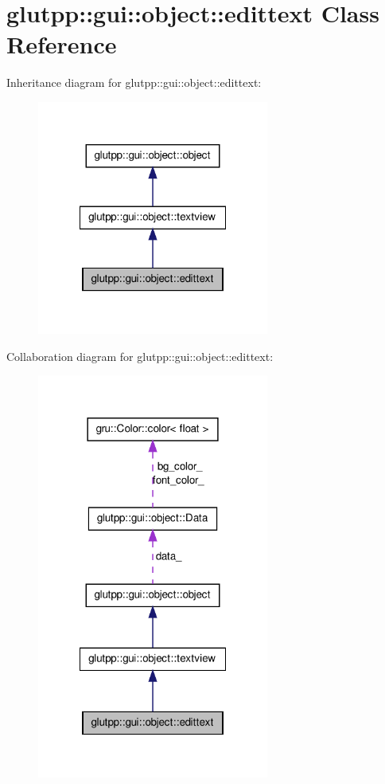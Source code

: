 \hypertarget{classglutpp_1_1gui_1_1object_1_1edittext}{\section{glutpp\-:\-:gui\-:\-:object\-:\-:edittext \-Class \-Reference}
\label{classglutpp_1_1gui_1_1object_1_1edittext}
}


\-Inheritance diagram for glutpp\-:\-:gui\-:\-:object\-:\-:edittext\-:\nopagebreak
\begin{figure}[H]
\begin{center}
\leavevmode
\includegraphics[width=216pt]{classglutpp_1_1gui_1_1object_1_1edittext__inherit__graph}
\end{center}
\end{figure}


\-Collaboration diagram for glutpp\-:\-:gui\-:\-:object\-:\-:edittext\-:
\nopagebreak
\begin{figure}[H]
\begin{center}
\leavevmode
\includegraphics[width=216pt]{classglutpp_1_1gui_1_1object_1_1edittext__coll__graph}
\end{center}
\end{figure}
